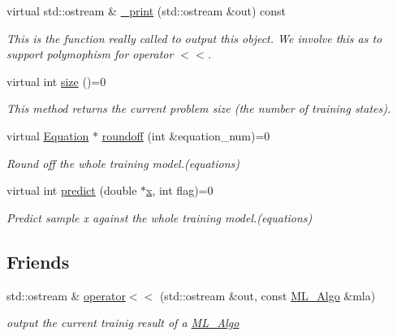 \begin{DoxyCompactItemize}
virtual std\+::ostream \& \hyperlink{classML__Algo_ad689e5642c5db0971c53909b52cc67d4}{\+\_\+print} (std\+::ostream \&out) const 
\begin{DoxyCompactList}\small\item\em This is the function really called to output this object. We involve this as to support polymophism for operator $<$$<$. \end{DoxyCompactList}\item 
virtual int \hyperlink{classML__Algo_a8650c3894c1992492f8bc86edf1b3ffd}{size} ()=0
\begin{DoxyCompactList}\small\item\em This method returns the current problem size (the number of training states). \end{DoxyCompactList}\item 
virtual \hyperlink{classEquation}{Equation} $\ast$ \hyperlink{classML__Algo_a398214e0462ebfdde10e745240030a34}{roundoff} (int \&equation\+\_\+num)=0
\begin{DoxyCompactList}\small\item\em Round off the whole training model.(equations) \end{DoxyCompactList}\item 
virtual int \hyperlink{classML__Algo_aae12eabc95fd3eb5305f1ae7a14e0193}{predict} (double $\ast$\hyperlink{untested_2pldi08_8c_a6150e0515f7202e2fb518f7206ed97dc}{x}, int flag)=0
\begin{DoxyCompactList}\small\item\em Predict sample x against the whole training model.(equations) \end{DoxyCompactList}\end{DoxyCompactItemize}
\subsection*{Friends}
\begin{DoxyCompactItemize}
\item 
std\+::ostream \& \hyperlink{classML__Algo_a0d340e61ce196741e6fe74b58f11961c}{operator$<$$<$} (std\+::ostream \&out, const \hyperlink{classML__Algo}{M\+L\+\_\+\+Algo} \&mla)
\begin{DoxyCompactList}\small\item\em output the current trainig result of a \hyperlink{classML__Algo}{M\+L\+\_\+\+Algo} \end{DoxyCompactList}\end{DoxyCompactItemize}


